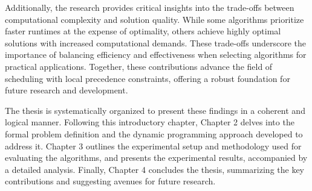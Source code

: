 Additionally, the research provides critical insights into the trade-offs between computational complexity and solution quality. While some algorithms prioritize faster runtimes at the expense of optimality, others achieve highly optimal solutions with increased computational demands. These trade-offs underscore the importance of balancing efficiency and effectiveness when selecting algorithms for practical applications. Together, these contributions advance the field of scheduling with local precedence constraints, offering a robust foundation for future research and development. \medbreak

The thesis is systematically organized to present these findings in a coherent and logical manner. Following this introductory chapter, Chapter 2 delves into the formal problem definition and the dynamic programming approach developed to address it. Chapter 3 outlines the experimental setup and methodology used for evaluating the algorithms, and presents the experimental results, accompanied by a detailed analysis. Finally, Chapter 4 concludes the thesis, summarizing the key contributions and suggesting avenues for future research.
